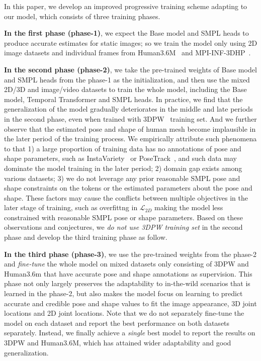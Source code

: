 \documentclass{article}
\begin{document}
In this paper,  we develop an improved progressive training scheme adapting to our model, which consists of three training phases. 

\textbf{In the first phase (phase-1)}, we  expect the Base model and SMPL heads to produce accurate estimates for static images; so we train the model only using 2D image datasets and individual frames from Human3.6M~\cite{h36m:ionescu2013human3} and MPI-INF-3DHP~\cite{mpii3d:mehta2017monocular}. 

\textbf{In the second phase (phase-2)}, we take the pre-trained weights of Base model and SMPL heads from the phase-1 as the initialization, and then use the mixed 2D/3D and image/video datasets to train the whole model, including the Base model, Temporal Transformer and SMPL heads. In practice, we find that the generalization of the model gradually deteriorates in the middle and late periods in the second phase, even when trained with 3DPW~\cite{3dpw:von2018recovering} training set.
And we further observe that the estimated pose and shape of human mesh become implausible in the later period of the training process. 
We empirically attribute such phenomena to that 1) a large proportion of training data has no annotations of pose and shape parameters, such as InstaVariety~\cite{insta:kanazawa2019learning} or PoseTrack~\cite{posetrack:andriluka2018posetrack}, and such data may dominate the model training in the later period; 2) domain gap exists among various datasets; 3) we do not leverage any prior reasonable SMPL pose and shape constraints on the tokens or the estimated parameters about the pose and shape. These factors may cause the conflicts between multiple objectives in the later stage of training, such as overfittng in $\mathcal{L}_{2D}$ making the model less constrained with reasonable SMPL pose or shape parameters.
Based on these observations and conjectures, we \textit{do not use 3DPW training set} in the second phase and develop the third training phase as follow. 

\textbf{In the third phase (phase-3)}, we use the pre-trained weights from the phase-2 and \textit{fine-tune} the whole model on mixed datasets only consisting of 3DPW and Human3.6m that have accurate pose and shape annotations as supervision.
This phase not only largely preserves the adaptability to in-the-wild scenarios that is learned in the phase-2, but also makes the model focus on learning to predict accurate and credible pose and shape values to fit the image appearance, 3D joint locations and 2D joint locations. 
Note that we do not separately fine-tune the model on each dataset and report the best performance on both datasets separately. 
Instead, we finally achieve a \textit{single} best model to report the results on 3DPW and Human3.6M, which has attained wider adaptability and good generalization.
\end{document}
